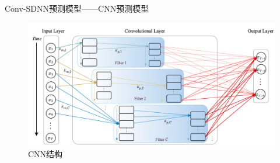 \begin{frame}{Conv-SDNN预测模型——CNN预测模型}


    \begin{figure}[!t]
        \centering
        \begin{minipage}{0.8\textwidth}
            \includegraphics[width = \textwidth]{float/ch.cnn/esm-cnn.png}
            \caption*{CNN结构}
        \end{minipage}    
    \end{figure}





\end{frame}


